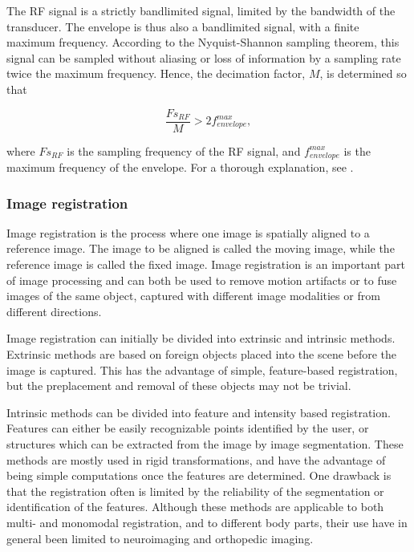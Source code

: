 The RF signal is a strictly bandlimited signal, limited by the bandwidth of the transducer. The envelope is thus also a bandlimited signal, with a finite maximum frequency. According to the Nyquist-Shannon sampling theorem, this signal can be sampled without aliasing or loss of information by a sampling rate twice the maximum frequency. Hence, the decimation factor, $M$, is determined so that

\begin{equation}
\label{deciamtion}
\frac{Fs_{RF}}{M} > 2f^{max}_{envelope},
\end{equation}

where $Fs_{RF}$ is the sampling frequency of the RF signal, and $f^{max}_{envelope}$ is the maximum frequency of the envelope. For a thorough explanation, see \cite{Crochiere1981}.


\subsubsection{Image registration}
Image registration is the process where one image is spatially aligned to a reference image. The image to be aligned is called the moving image, while the reference image is called the fixed image. Image registration  is an important part of image processing and can both be used to remove motion artifacts or to fuse images of the same object, captured with different image modalities or from different directions. 

Image registration can initially be divided into extrinsic and intrinsic methods. Extrinsic methods are based on foreign objects placed into the scene before the image is captured. This has the advantage of simple, feature-based registration, but the preplacement and removal of these objects may not be trivial. 

Intrinsic methods can be divided into feature and intensity based registration. Features can either be easily recognizable points identified by the user, or structures which can be extracted from the image by image segmentation. These methods are mostly used in rigid transformations, and have the advantage of being simple computations once the features are determined. One drawback is that the registration often is limited by the reliability of the segmentation or identification of the features. Although these methods are applicable to both multi- and monomodal registration, and to different body parts, their use have in general been limited to neuroimaging and orthopedic imaging\cite{Maintz1998}.

